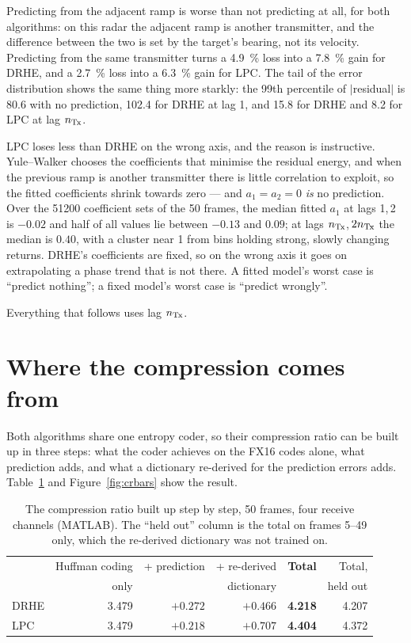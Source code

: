 Predicting from the adjacent ramp is worse than not predicting at all, for both
algorithms: on this radar the adjacent ramp is another transmitter, and the
difference between the two is set by the target's bearing, not its velocity.
Predicting from the same transmitter turns a \SI{4.9}{\percent} loss into a
\SI{7.8}{\percent} gain for DRHE, and a \SI{2.7}{\percent} loss into a
\SI{6.3}{\percent} gain for LPC. The tail of the error distribution shows the
same thing more starkly: the 99th percentile of $|$residual$|$ is \num{80.6}
with no prediction, \num{102.4} for DRHE at lag 1, and \num{15.8} for DRHE and
\num{8.2} for LPC at lag $n_{\mathrm{Tx}}$.

LPC loses less than DRHE on the wrong axis, and the reason is instructive.
Yule--Walker chooses the coefficients that minimise the residual energy, and
when the previous ramp is another transmitter there is little correlation to
exploit, so the fitted coefficients shrink towards zero --- and
$a_1 = a_2 = 0$ \emph{is} no prediction. Over the \num{51200} coefficient sets
of the 50 frames, the median fitted $a_1$ at lags 1,\,2 is $-0.02$ and half of
all values lie between $-0.13$ and $0.09$; at lags $n_{\mathrm{Tx}}$,\,$2n_{\mathrm{Tx}}$ the median
is $0.40$, with a cluster near 1 from bins holding strong, slowly changing
returns. DRHE's coefficients are fixed, so on the wrong axis it goes on
extrapolating a phase trend that is not there. A fitted model's worst case is
``predict nothing''; a fixed model's worst case is ``predict wrongly''.

Everything that follows uses lag $n_{\mathrm{Tx}}$.

\section{Where the compression comes from}
\label{sec:decomp}

Both algorithms share one entropy coder, so their compression ratio can be
built up in three steps: what the coder achieves on the FX16 codes alone, what
prediction adds, and what a dictionary re-derived for the prediction errors
adds. Table~\ref{tab:decomp} and Figure~\ref{fig:crbars} show the result.

\begin{table}[htbp]
\centering
\caption[Where the compression comes from]{The compression ratio built up step
by step, 50 frames, four receive channels (MATLAB). The ``held out'' column is
the total on frames 5--49 only, which the re-derived dictionary was not trained
on.}
\label{tab:decomp}
\small
\begin{tabular}{@{}lrrrrr@{}}
\toprule
& Huffman coding & + prediction & + re-derived & \textbf{Total} & Total,\\
& only & & dictionary & & held out\\
\midrule
DRHE & \num{3.479} & $+\num{0.272}$ & $+\num{0.466}$ & \textbf{\num{4.218}} & \num{4.207}\\
LPC  & \num{3.479} & $+\num{0.218}$ & $+\num{0.707}$ & \textbf{\num{4.404}} & \num{4.372}\\
\bottomrule
\end{tabular}
\end{table}

